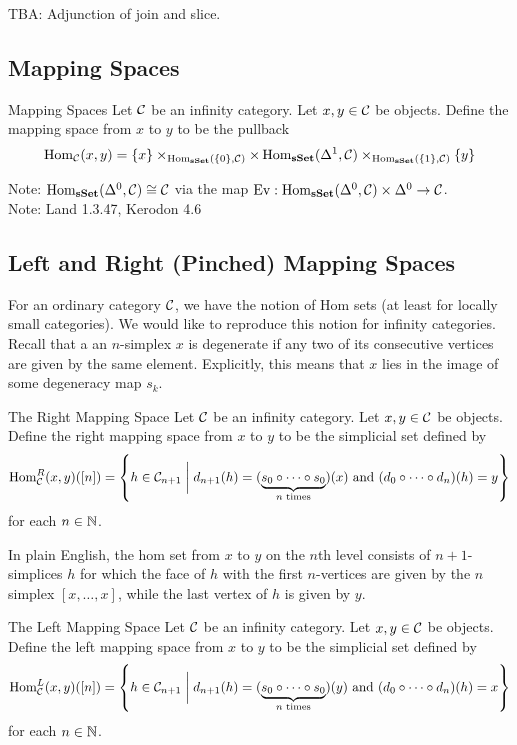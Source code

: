 \documentclass[a4paper]{article}
\begin{document}
TBA: Adjunction of join and slice. 

\subsection{Mapping Spaces}
\begin{defn}{Mapping Spaces}{} Let $\mathcal{C}$ be an infinity category. Let $x,y\in\mathcal{C}$ be objects. Define the mapping space from $x$ to $y$ to be the pullback $$\operatorname{Hom}_{\mathcal{C}}(x,y)=\{x\}\times_{\operatorname{Hom}_\bold{sSet}(\{0\},\mathcal{C})}\times\operatorname{Hom}_\bold{sSet}(\Delta^1,\mathcal{C})\times_{\operatorname{Hom}_\bold{sSet}(\{1\},\mathcal{C})}\{y\}$$
\end{defn}

Note: $\operatorname{Hom}_\bold{sSet}(\Delta^0,\mathcal{C})\cong\mathcal{C}$ via the map $\text{Ev}:\operatorname{Hom}_\bold{sSet}(\Delta^0,\mathcal{C})\times\Delta^0\to\mathcal{C}$. \\

Note: Land 1.3.47, Kerodon 4.6

\subsection{Left and Right (Pinched) Mapping Spaces}
For an ordinary category $\mathcal{C}$, we have the notion of Hom sets (at least for locally small categories). We would like to reproduce this notion for infinity categories. \\

Recall that a an $n$-simplex $x$ is degenerate if any two of its consecutive vertices are given by the same element. Explicitly, this means that $x$ lies in the image of some degeneracy map $s_k$. 

\begin{defn}{The Right Mapping Space}{} Let $\mathcal{C}$ be an infinity category. Let $x,y\in\mathcal{C}$ be objects. Define the right mapping space from $x$ to $y$ to be the simplicial set defined by $$\operatorname{Hom}_{\mathcal{C}}^R(x,y)([n])=\left\{h\in\mathcal{C}_{n+1}\;\bigg{|}\;d_{n+1}(h)=(\underbrace{s_0\circ\cdots\circ s_0}_{n\text{ times}})(x)\text{ and }(d_0\circ\cdots\circ d_n)(h)=y\right\}$$ for each $n\in\mathbb{N}$. 
\end{defn}

In plain English, the hom set from $x$ to $y$ on the $n$th level consists of $n+1$-simplices $h$ for which the face of $h$ with the first $n$-vertices are given by the $n$ simplex $[x,\dots,x]$, while the last vertex of $h$ is given by $y$. 

\begin{defn}{The Left Mapping Space}{} Let $\mathcal{C}$ be an infinity category. Let $x,y\in\mathcal{C}$ be objects. Define the left mapping space from $x$ to $y$ to be the simplicial set defined by $$\operatorname{Hom}_{\mathcal{C}}^L(x,y)([n])=\left\{h\in\mathcal{C}_{n+1}\;\bigg{|}\;d_{n+1}(h)=(\underbrace{s_0\circ\cdots\circ s_0}_{n\text{ times}})(y)\text{ and }(d_0\circ\cdots\circ d_n)(h)=x\right\}$$ for each $n\in\mathbb{N}$. 
\end{defn}
\end{document}
